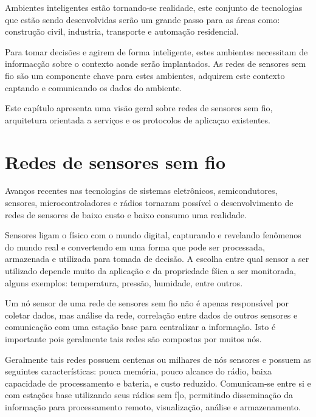Ambientes inteligentes est\~ao tornando-se realidade, este conjunto de tecnologias que est\~ao sendo desenvolvidas ser\~ao um grande passo para as \'areas como: constru\c{c}\~ao civil, industria, transporte e automa\c{c}\~ao residencial.

Para tomar decis\~oes e agirem de forma inteligente, estes ambientes necessitam de informac\c{c}\~ao sobre o contexto aonde ser\~ao implantados. As redes de sensores sem fio s\~ao um componente chave para estes ambientes, adquirem este contexto captando e  comunicando os dados do ambiente.\cite{lewis2004wireless}

Este cap\'itulo apresenta uma vis\~ao geral sobre redes de sensores sem fio, arquitetura orientada a servi\c{c}os e os protocolos de aplica\c{c}ao existentes.

\section{Redes de sensores sem fio}

Avan\c{c}os recentes nas tecnologias de sistemas eletr\^onicos, semicondutores, sensores, microcontroladores e r\'adios tornaram poss\'ivel o desenvolvimento de redes de sensores de baixo custo e baixo consumo uma realidade.

Sensores ligam o f\'isico com o mundo digital, capturando e revelando fen\^omenos do mundo real e convertendo em uma forma que pode ser processada, armazenada e utilizada para tomada de decis\~ao. A escolha entre qual sensor a ser utilizado depende muito da aplica\c{c}\~ao e da propriedade f\'sica a ser monitorada, alguns exemplos: temperatura, press\~ao, humidade, entre outros.

Um n\'o sensor de uma rede de sensores sem fio n\~ao \'e apenas respons\'avel por coletar dados, mas an\'alise da rede, correla\c{c}\~ao entre dados de outros sensores e comunica\c{c}\~ao com uma esta\c{c}\~ao base para centralizar a informa\c{c}\~ao. Isto \'e importante pois geralmente tais redes s\~ao compostas por muitos n\'os. \cite{dargie2010fundamentals}

Geralmente tais redes possuem centenas ou milhares de n\'os sensores e possuem as seguintes caracter\'isticas: pouca mem\'oria, pouco alcance do r\'adio, baixa capacidade de processamento e bateria, e custo reduzido. Comunicam-se entre si e com esta\c{c}\~oes base utilizando seus r\'adios sem f|o, permitindo dissemina\c{c}\~ao da informa\c{c}\~ao para processamento remoto, visualiza\c{c}\~ao, an\'alise e armazenamento.

